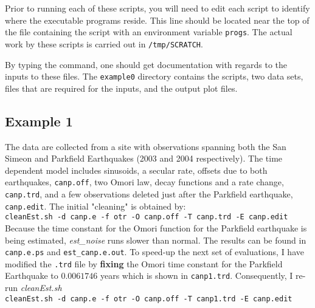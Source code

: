 \documentclass[12pt]{amsart}
\begin{document}
Prior to running each of these scripts, you will need to edit each script to identify where the executable programs reside.
This line should be located near the top of the file containing the script with an environment variable \texttt{progs}.  The actual
work by these scripts is carried out in \texttt{/tmp/SCRATCH}.

By typing the command, one should get documentation with regards to the inputs to these files. The \texttt{example0} directory
contains the scripts, two data sets, files that are required for the inputs, and the output plot files.

\subsection{Example 1}

The data are collected from a site with observations spanning both the San Simeon and Parkfield  Earthquakes (2003 and 2004
respectively). The time dependent model includes sinusoids, a secular rate, offsets due to both earthquakes, \texttt{canp.off},
two Omori law, decay functions and a rate change, \texttt{canp.trd}, and a few observations deleted just after the Parkfield
earthquake, \texttt{canp.edit}.  The initial "cleaning" is obtained by:
\\
\texttt{cleanEst.sh -d canp.e -f otr -O canp.off -T canp.trd -E canp.edit}
\\

Because the time constant for the Omori function for the Parkfield earthquake is being estimated, \textit{est\_noise} runs
slower than normal.  The results can be found in \texttt{canp.e.ps} and \texttt{est\_canp.e.out}.  To speed-up the
next set of evaluations, I have modified the \texttt{.trd} file by \textbf{fixing} the Omori time constant for the Parkfield
Earthquake to $0.0061746$ years which is shown in \texttt{canp1.trd}. Consequently, I re-run \textit{cleanEst.sh}
\\
\texttt{cleanEst.sh -d canp.e -f otr -O canp.off -T canp1.trd -E canp.edit}
\\
\end{document}
